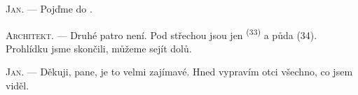 \textsc{Jan}. --- Pojďme do .

\textsc{Architekt}. --- Druhé patro není. Pod střechou jsou jen  \textsuperscript{(33)} a půda (34). Prohlídku jsme skončili, můžeme sejít
dolů.

\textsc{Jan}. --- Děkuji, pane, je to velmi zajímavé. Hned vypravím otci všechno, co
jsem viděl.
